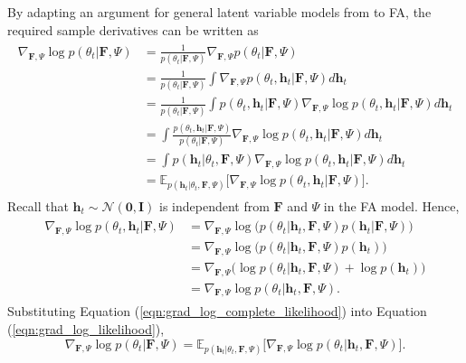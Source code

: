 \documentclass[msc,deptreport.inf]{infthesis} %
\newcommand{\matr}[1]{\mathbf{#1}}
\newcommand{\E}{\mathbb E}
\begin{document}
By adapting an argument for general latent variable models from \cite{barber2007} to FA, the required sample derivatives can be written as
\begin{align}\label{eqn:grad_log_likelihood}
\begin{split}
	\nabla_{\matr{F}, \Psi} \log p(\theta_t | \matr{F}, \Psi) 
	& = \frac{1}{p(\theta_t | \matr{F}, \Psi)} \nabla_{\matr{F}, \Psi} p(\theta_t | \matr{F}, \Psi) \\
	& = \frac{1}{p(\theta_t | \matr{F}, \Psi)} \int \nabla_{\matr{F}, \Psi} p(\theta_t, \matr{h}_t | \matr{F}, \Psi) d\matr{h}_t \\
	& = \frac{1}{p(\theta_t | \matr{F}, \Psi)} \int p(\theta_t, \matr{h}_t | \matr{F}, \Psi) \nabla_{\matr{F}, \Psi} \log p(\theta_t, \matr{h}_t | \matr{F}, \Psi) d\matr{h}_t \\
	& = \int \frac{p(\theta_t, \matr{h}_t | \matr{F}, \Psi)}{p(\theta_t | \matr{F}, \Psi)} \nabla_{\matr{F}, \Psi} \log p(\theta_t, \matr{h}_t | \matr{F}, \Psi)  d\matr{h}_t \\
	& = \int p(\matr{h}_t | \theta_t, \matr{F}, \Psi) \nabla_{\matr{F}, \Psi} \log p(\theta_t, \matr{h}_t | \matr{F}, \Psi)  d\matr{h}_t\\
	& = \E_{p(\matr{h}_t | \theta_t, \matr{F}, \Psi)} \big[ \nabla_{\matr{F}, \Psi} \log p(\theta_t, \matr{h}_t | \matr{F}, \Psi) \big].
\end{split}
\end{align}
Recall that $\matr{h}_t \sim \mathcal{N}(\matr{0}, \matr{I})$ is independent from $\matr{F}$ and $\Psi$ in the FA model. Hence,
\begin{align}\label{eqn:grad_log_complete_likelihood}
\begin{split}
	\nabla_{\matr{F}, \Psi} \log p(\theta_t, \matr{h}_t | \matr{F}, \Psi)
	& = \nabla_{\matr{F}, \Psi} \log \big(p(\theta_t | \matr{h}_t, \matr{F}, \Psi)p(\matr{h}_t | \matr{F}, \Psi)\big) \\
	& = \nabla_{\matr{F}, \Psi} \log \big(p(\theta_t | \matr{h}_t, \matr{F}, \Psi)p(\matr{h}_t)\big) \\
	& = \nabla_{\matr{F}, \Psi} \big( \log p(\theta_t | \matr{h}_t, \matr{F}, \Psi) + \log p(\matr{h}_t)\big) \\
	& = \nabla_{\matr{F}, \Psi} \log p(\theta_t | \matr{h}_t, \matr{F}, \Psi).
\end{split}
\end{align}
Substituting Equation (\ref{eqn:grad_log_complete_likelihood}) into Equation (\ref{eqn:grad_log_likelihood}),
\begin{equation}\label{eqn:simplified_grad_log_likelihood}
	\nabla_{\matr{F}, \Psi} \log p(\theta_t | \matr{F}, \Psi)
	= \E_{p(\matr{h}_t | \theta_t, \matr{F}, \Psi)} \big[ \nabla_{\matr{F}, \Psi} \log p(\theta_t | \matr{h}_t, \matr{F}, \Psi) \big].
\end{equation}
\end{document}
